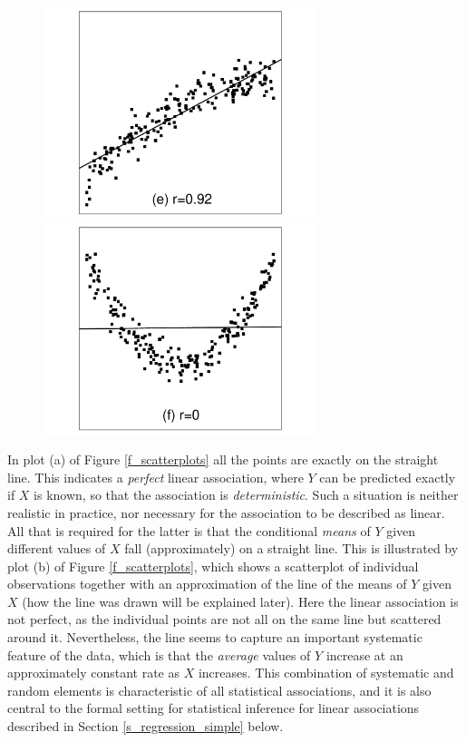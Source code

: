 \begin{figure}
\begin{center}
\hspace*{-2.5em}
\includegraphics[width=8cm]{olspl5}\hspace*{-5em}
\includegraphics[width=8cm]{olspl6}\\
\end{center}
\end{figure}

In plot (a) of Figure \ref{f_scatterplots} all the points are exactly on
the straight line. This indicates a \emph{perfect} linear association,
where $Y$ can be predicted exactly if $X$ is known, so that the association is
\emph{deterministic}. Such a situation is neither realistic in
practice, nor necessary for the association to be
described as linear. All that is required for the latter is that the
conditional \emph{means} of $Y$ given different values of $X$ fall
(approximately) on a straight line. This is illustrated by plot (b) of
Figure \ref{f_scatterplots}, which shows a scatterplot of individual
observations together with an approximation of the line of the means of
$Y$ given $X$ (how the line was drawn will be explained later). Here the
linear association is not perfect, as the individual points are not all
on the same line but scattered around it. Nevertheless, the line seems
to capture an important systematic feature of the data, which is that
the \emph{average} values of $Y$ increase at an approximately constant
rate as $X$ increases. This combination of systematic and random
elements is characteristic of all statistical associations, and it is
also central to the formal setting for statistical inference for linear
associations described in Section \ref{s_regression_simple} below.

